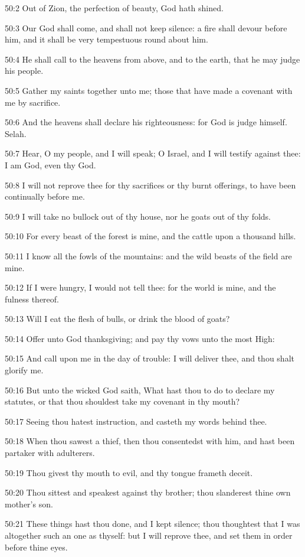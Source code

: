 50:2 Out of Zion, the perfection of beauty, God hath shined.

50:3 Our God shall come, and shall not keep silence: a fire shall
devour before him, and it shall be very tempestuous round about him.

50:4 He shall call to the heavens from above, and to the earth, that
he may judge his people.

50:5 Gather my saints together unto me; those that have made a
covenant with me by sacrifice.

50:6 And the heavens shall declare his righteousness: for God is judge
himself. Selah.

50:7 Hear, O my people, and I will speak; O Israel, and I will testify
against thee: I am God, even thy God.

50:8 I will not reprove thee for thy sacrifices or thy burnt
offerings, to have been continually before me.

50:9 I will take no bullock out of thy house, nor he goats out of thy
folds.

50:10 For every beast of the forest is mine, and the cattle upon a
thousand hills.

50:11 I know all the fowls of the mountains: and the wild beasts of
the field are mine.

50:12 If I were hungry, I would not tell thee: for the world is mine,
and the fulness thereof.

50:13 Will I eat the flesh of bulls, or drink the blood of goats?

50:14 Offer unto God thanksgiving; and pay thy vows unto the most
High:

50:15 And call upon me in the day of trouble: I will deliver thee, and
thou shalt glorify me.

50:16 But unto the wicked God saith, What hast thou to do to declare
my statutes, or that thou shouldest take my covenant in thy mouth?

50:17 Seeing thou hatest instruction, and casteth my words behind
thee.

50:18 When thou sawest a thief, then thou consentedst with him, and
hast been partaker with adulterers.

50:19 Thou givest thy mouth to evil, and thy tongue frameth deceit.

50:20 Thou sittest and speakest against thy brother; thou slanderest
thine own mother's son.

50:21 These things hast thou done, and I kept silence; thou thoughtest
that I was altogether such an one as thyself: but I will reprove thee,
and set them in order before thine eyes.

